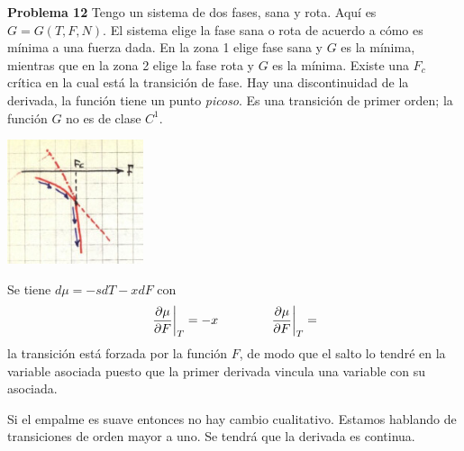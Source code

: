 \documentclass[10pt,oneside]{CBFT_book}
\begin{document}
\begin{ejemplo}{\bf Problema 12}
Tengo un sistema de dos fases, sana y rota. Aquí es $G = G(T,F,N)$.
El sistema elige la fase sana o rota de acuerdo a cómo es mínima a una fuerza dada.
En la zona 1 elige fase sana y $G$ es la mínima, mientras que en la zona 2 elige la
fase rota y $G$ es la mínima.
Existe una $F_c$ crítica en la cual está la transición de fase.
Hay una discontinuidad de la derivada, la función tiene un punto {\it picoso}.
Es una transición de primer orden; la función $G$ no es de clase $C^1$.

\includegraphics[width=0.30\textwidth]{images/1606329139.jpg}

Se tiene $ d\mu = - s dT - x dF$ con
\[
	\left.\frac{\partial^{\hspace{-0.05em}} {\mu}}{\partial {F}^{\hspace{-0.05em}}}\right|_{T} = -x \qquad \qquad  \left.\frac{\partial^{\hspace{-0.05em}} {\mu}}{\partial {F}^{\hspace{-0.05em}}}\right|_{T} = 
\]
la transición está forzada por la función $F$, de modo que el salto lo tendré en la
variable asociada puesto que la primer derivada vincula una variable con su asociada.

Si el empalme es suave entonces no hay cambio cualitativo. Estamos hablando de transiciones
de orden mayor a uno. Se tendrá que la derivada es continua.
 
\end{ejemplo}
\end{document}
